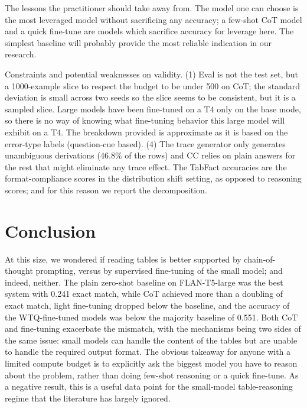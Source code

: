 \documentclass[sigconf]{acmart}
\begin{document}
The lessons the practitioner should take away from. The model one can choose is the most leveraged model without sacrificing any accuracy; a few-shot CoT model and a quick fine-tune are models which sacrifice accuracy for leverage here. The simplest baseline will probably provide the most reliable indication in our research.

Constraints and potential weaknesses on validity. (1) Eval is not the test set, but a 1000-example slice to respect the budget to be under 500 on CoT; the standard deviation is small across two seeds so the slice seems to be consistent, but it is a sampled slice. Large models have been fine-tuned on a T4 only on the base mode, so there is no way of knowing what fine-tuning behavior this large model will exhibit on a T4. The breakdown provided is approximate as it is based on the error-type labels (question-cue based). (4) The trace generator only generates unambiguous derivations (46.8\% of the rows) and CC relies on plain answers for the rest that might eliminate any trace effect. The TabFact accuracies are the format-compliance scores in the distribution shift setting, as opposed to reasoning scores; and for this reason we report the decomposition.

\section{Conclusion}
At this size, we wondered if reading tables is better supported by chain-of-thought prompting, versus by supervised fine-tuning of the small model; and indeed, neither. The plain zero-shot baseline on FLAN-T5-large was the best system with 0.241 exact match, while CoT achieved more than a doubling of exact match, light fine-tuning dropped below the baseline, and the accuracy of the WTQ-fine-tuned models was below the majority baseline of 0.551. Both CoT and fine-tuning exacerbate the mismatch, with the mechanisms being two sides of the same issue: small models can handle the content of the tables but are unable to handle the required output format. The obvious takeaway for anyone with a limited compute budget is to explicitly ask the biggest model you have to reason about the problem, rather than doing few-shot reasoning or a quick fine-tune. As a negative result, this is a useful data point for the small-model table-reasoning regime that the literature has largely ignored.
\end{document}
